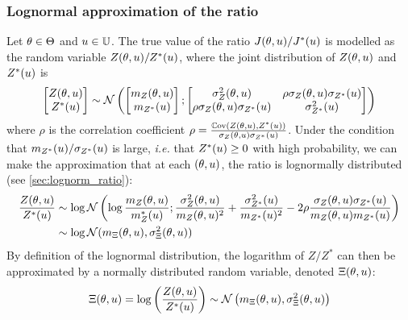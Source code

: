 \documentclass[../../Main_ManuscritThese.tex]{subfiles}
\begin{document}
\subsubsection{Lognormal approximation of the ratio}
\label{ssec:lognormal_approx}
Let $\theta\in\Theta$ and $u\in\mathbb{U}$.  The true value of the ratio
$J(\theta,u)/J^*(u)$ is modelled as the random variable
$Z(\theta,u)/Z^*(u)$, where the joint distribution of $Z(\theta, u)$
and $Z^*(u)$ is
\begin{equation}
  \begin{bmatrix}
    Z(\theta, u) \\ Z^*(u)
  \end{bmatrix}
  \sim \mathcal{N}\left(
    \begin{bmatrix}
      m_Z(\theta, u) \\ m_{Z^*}(u)
    \end{bmatrix}
    ;
    \begin{bmatrix}
      \sigma^2_Z(\theta, u) &\rho \sigma_Z(\theta, u)\sigma_{Z^*}(u) \\
      \rho \sigma_Z(\theta, u)\sigma_{Z^*}(u) & \sigma^2_{Z^*}(u) 
    \end{bmatrix}
  \right)
\end{equation}
where $\rho$ is the correlation coefficient
$\rho = \frac{\mathbb{C}\mathrm{ov}\left(Z(\theta, u), Z^*(u)\right)}{\sigma_Z(\theta,
  u)\sigma_{Z^*}(u)}$.
Under the condition that $m_{Z^*}(u)/\sigma_{Z^*}(u)$ is large,
\textit{i.e.} that $Z^*(u) \geq 0$ with high probability, we can
make the approximation that at each $(\theta, u)$, the ratio is
lognormally distributed (see \cref{sec:lognorm_ratio}):
\begin{align}
  \label{eq:log_ratio_eq}
  \frac{Z(\theta, u)}{Z^*(u)}&\sim \log \mathcal{N}\left(\log\frac{m_Z(\theta, u)}{m_{Z}^*(u)};\frac{\sigma^2_Z(\theta, u)}{m_Z(\theta, u)^2}+\frac{\sigma^2_{Z^*}(u)}{m_{{Z^*}}(u)^2} -  2 \rho \frac{\sigma_Z(\theta,u) \sigma_{Z^*}(u)}{m_{Z}(\theta, u)m_{Z^*}(u)}\right) \\
  &\sim \log\mathcal{N}(m_{\Xi}(\theta, u), \sigma^2_{\Xi}(\theta, u))
\end{align}
By definition of the lognormal distribution, the logarithm of $Z/ Z^*$
can then be approximated by a normally distributed random variable, denoted $\Xi(\theta, u)$:
\begin{equation}
  \label{eq:log_ratio}
  \Xi(\theta,u) =  \log\left(\frac{Z(\theta, u)}{Z^*(u)}\right)\sim \mathcal{N}\left(m_{\Xi}(\theta, u),\sigma_{\Xi}^2(\theta, u)\right)
\end{equation}
\end{document}
